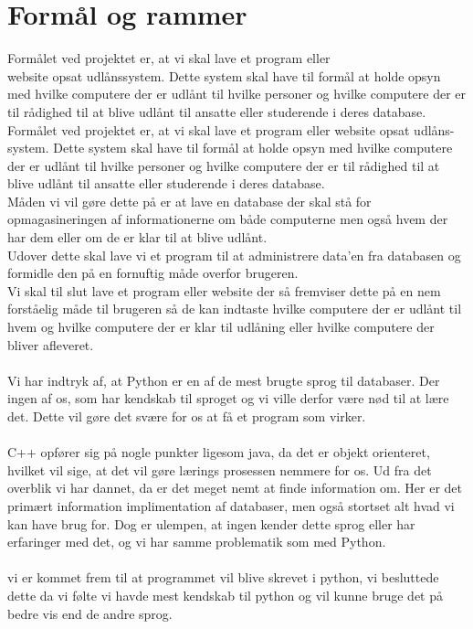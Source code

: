 \documentclass[a4paper]{article}
\begin{document}
\section{Formål og rammer}
Formålet ved projektet er, at vi skal lave et program eller \\ website opsat udlånssystem. Dette system skal have til formål at holde opsyn med hvilke computere der er udlånt til hvilke personer og hvilke computere der er til rådighed til at blive udlånt til ansatte eller studerende i deres database.\\
Formålet ved projektet er, at vi skal lave et program eller website opsat udlåns-system. Dette system skal have til formål at holde opsyn med hvilke computere der er udlånt til hvilke personer og hvilke computere der er til rådighed til at blive udlånt til ansatte eller studerende i deres database.\\
Måden vi vil gøre dette på er at lave en database der skal stå for opmagasineringen af informationerne om både computerne men også hvem der har dem eller om de er klar til at blive udlånt.\\
Udover dette skal lave vi et program til at administrere data’en fra databasen og formidle den på en fornuftig måde overfor brugeren.\\
Vi skal til slut lave et program eller website der så fremviser dette på en nem forståelig måde til brugeren så de kan indtaste hvilke computere der er udlånt til hvem og hvilke computere der er klar til udlåning eller hvilke computere der bliver afleveret.\\ \\
Vi har indtryk af, at Python er en af de mest brugte sprog til databaser. Der ingen af os, som har kendskab til sproget og vi ville derfor være nød til at lære det. Dette vil gøre det svære for os at få et program som virker.\\ \\
C++ opfører sig på nogle punkter ligesom java, da det er objekt orienteret, hvilket vil sige, at det vil gøre lærings prosessen nemmere for os. Ud fra det overblik vi har dannet, da er det meget nemt at finde information om. Her er det primært information implimentation af databaser, men også stortset alt hvad vi kan have brug for. Dog er ulempen, at ingen kender dette sprog eller har erfaringer med det, og vi har samme problematik som med Python.\\ \\
vi er kommet frem til at programmet vil blive skrevet i python, vi besluttede dette da vi følte vi havde mest kendskab til python og vil kunne bruge det på bedre vis end de andre sprog. \\
\end{document}
